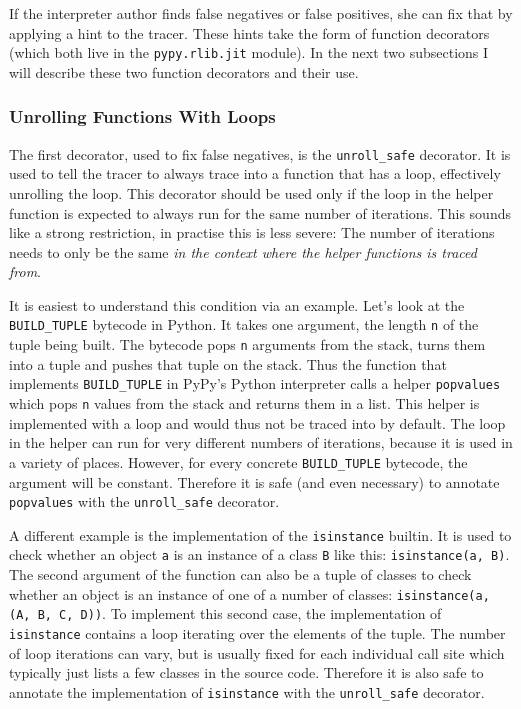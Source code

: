 \documentclass{sig-alternate}
\begin{document}
If the interpreter author finds false negatives or false positives, she can fix
that by applying a hint to the tracer. These hints take the form of function
decorators (which both live in the \texttt{pypy.rlib.jit} module). In the next two
subsections I will describe these two function decorators and their use.



\subsubsection{Unrolling Functions With Loops}

The first decorator, used to fix false negatives, is the \texttt{unroll\_safe}
decorator. It is used to tell the tracer to always trace into a function that
has a loop, effectively unrolling the loop. This decorator should be used only
if the loop in the helper function is expected to always run for the same number
of iterations. This sounds like a strong restriction, in practise this is less
severe: The number of iterations needs to only be the same \emph{in the context where
the helper functions is traced from}.

It is easiest to understand this condition via an example. Let's look at the
\texttt{BUILD\_TUPLE} bytecode in Python. It takes one argument, the length \texttt{n} of
the tuple being built. The bytecode pops \texttt{n} arguments from the stack, turns
them into a tuple and pushes that tuple on the stack. Thus the function that
implements \texttt{BUILD\_TUPLE} in PyPy's Python interpreter calls a helper
\texttt{popvalues} which pops \texttt{n} values from the stack and returns them in a list.
This helper is implemented with a loop and would thus not be traced into by
default.  The loop in the helper can run for very different numbers of
iterations, because it is used in a variety of places. However, for every
concrete \texttt{BUILD\_TUPLE} bytecode, the argument will be constant. Therefore it
is safe (and even necessary) to annotate \texttt{popvalues} with the \texttt{unroll\_safe}
decorator.

A different example is the implementation of the \texttt{isinstance} builtin. It is
used to check whether an object \texttt{a} is an instance of a class \texttt{B} like
this: \texttt{isinstance(a, B)}. The second argument of the function can also be a
tuple of classes to check whether an object is an instance of one of a number of
classes: \texttt{isinstance(a, (A, B, C, D))}. To implement this second case, the
implementation of \texttt{isinstance} contains a loop iterating over the elements of
the tuple. The number of loop iterations can vary, but is usually fixed for each
individual call site which typically just lists a few classes in the source
code. Therefore it is also safe to annotate the implementation of \texttt{isinstance}
with the \texttt{unroll\_safe} decorator.
\end{document}

